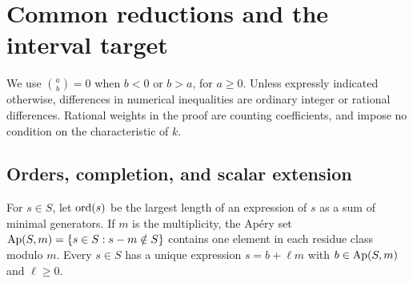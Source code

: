 \section{Common reductions and the interval target}
\label{sec:preliminaries}
We use $\binom ab=0$ when $b<0$ or $b>a$, for $a\ge0$.
Unless expressly indicated otherwise, differences in numerical
inequalities are ordinary integer or rational differences. Rational
weights in the proof are counting coefficients, and impose no condition
on the characteristic of $k$.

\subsection{Orders, completion, and scalar extension}
For $s\in S$, let $\operatorname{ord}(s)$ be the largest length of an expression of
$s$ as a sum of minimal generators. If $m$ is the multiplicity, the
Ap\'ery set $\operatorname{Ap}(S,m)=\{s\in S:s-m\notin S\}$ contains one element
in each residue class modulo $m$. Every $s\in S$ has a unique expression
$s=b+\ell m$ with $b\in\operatorname{Ap}(S,m)$ and $\ell\ge0$.

